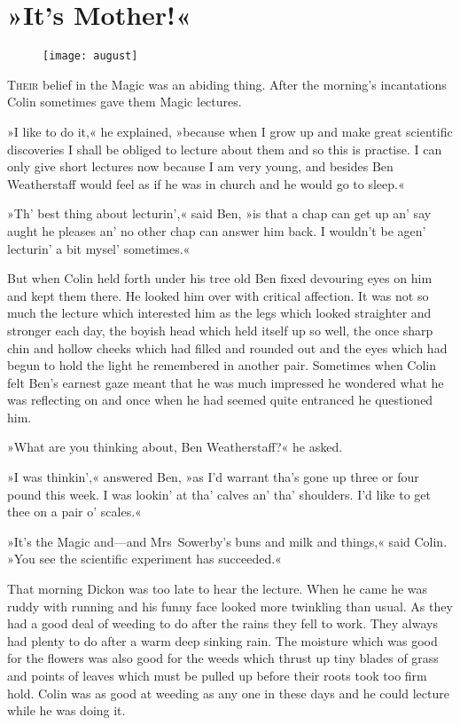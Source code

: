 \chapter{»It's Mother!«} 
	
\begin{figure}[t!]
\centering
\texttt{[image: august]}
\end{figure}

 \lettrine[lines=6]{T}{heir} belief in the Magic was an abiding thing. After the morning's incantations Colin sometimes gave them Magic lectures.

\zz
»I like to do it,« he explained, »because when I grow up and make great scientific discoveries I shall be obliged to lecture about them and so this is practise. I can only give short lectures now because I am very young, and besides Ben Weatherstaff would feel as if he was in church and he would go to sleep.«

»Th' best thing about lecturin',« said Ben, »is that a chap can get up an' say aught he pleases an' no other chap can answer him back. I wouldn't be agen' lecturin' a bit mysel' sometimes.«

But when Colin held forth under his tree old Ben fixed devouring eyes on him and kept them there. He looked him over with critical affection. It was not so much the lecture which interested him as the legs which looked straighter and stronger each day, the boyish head which held itself up so well, the once sharp chin and hollow cheeks which had filled and rounded out and the eyes which had begun to hold the light he remembered in another pair. Sometimes when Colin felt Ben's earnest gaze meant that he was much impressed he wondered what he was reflecting on and once when he had seemed quite entranced he questioned him.

»What are you thinking about, Ben Weatherstaff?« he asked.

»I was thinkin',« answered Ben, »as I'd warrant tha's gone up three or four pound this week. I was lookin' at tha' calves an' tha' shoulders. I'd like to get thee on a pair o' scales.«

»It's the Magic and—and Mrs~Sowerby's buns and milk and things,« said Colin. »You see the scientific experiment has succeeded.«

That morning Dickon was too late to hear the lecture. When he came he was ruddy with running and his funny face looked more twinkling than usual. As they had a good deal of weeding to do after the rains they fell to work. They always had plenty to do after a warm deep sinking rain. The moisture which was good for the flowers was also good for the weeds which thrust up tiny blades of grass and points of leaves which must be pulled up before their roots took too firm hold. Colin was as good at weeding as any one in these days and he could lecture while he was doing it.

